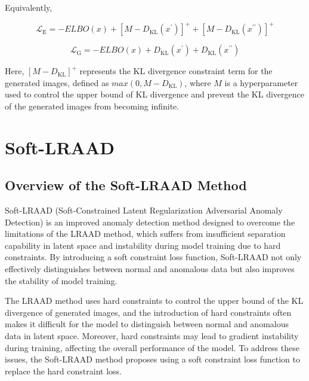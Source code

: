 \documentclass{article}
\begin{document}
Equivalently,

\begin{equation}
  \mathcal{L}_{\mathrm{E}}=-ELBO(x) + [M - D_{\mathrm{KL}}(x^\prime)]^{+} + [M - D_{\mathrm{KL}}(x^{\prime\prime})]^{+}
\end{equation}

\begin{equation}
  \mathcal{L}_{\text {G}}=-ELBO(x) + D_\mathrm{KL}(x^\prime) + D_\mathrm{KL}(x^{\prime\prime})
\end{equation}

Here, $[M - D_{\mathrm{KL}}]^{+}$ represents the KL divergence constraint term for the generated images, defined as $max(0, M - D_{\mathrm{KL}})$, where $M$ is a hyperparameter used to control the upper bound of KL divergence and prevent the KL divergence of the generated images from becoming infinite.

\section{Soft-LRAAD}

\subsection{Overview of the Soft-LRAAD Method}

Soft-LRAAD (Soft-Constrained Latent Regularization Adversarial Anomaly Detection) is an improved anomaly detection method designed to overcome the limitations of the LRAAD method, which suffers from insufficient separation capability in latent space and instability during model training due to hard constraints. By introducing a soft constraint loss function, Soft-LRAAD not only effectively distinguishes between normal and anomalous data but also improves the stability of model training.

The LRAAD method uses hard constraints to control the upper bound of the KL divergence of generated images, and the introduction of hard constraints often makes it difficult for the model to distinguish between normal and anomalous data in latent space. Moreover, hard constraints may lead to gradient instability during training, affecting the overall performance of the model. To address these issues, the Soft-LRAAD method proposes using a soft constraint loss function to replace the hard constraint loss.
\end{document}
